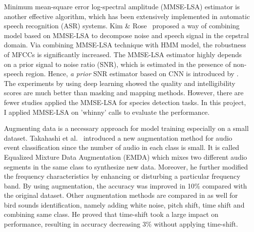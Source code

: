 Minimum mean-square error log-spectral amplitude (MMSE-LSA) estimator is another effective algorithm, which has been extensively implemented in automatic speech recognition (ASR) systems. Kim \& Rose~\cite{kim2002cepstrum} proposed a way of combining model based on MMSE-LSA to decompose noise and speech signal in the cepstral domain. Via combining MMSE-LSA technique with HMM model, the robustness of MFCCs is significantly increased. The MMSE-LSA estimator highly depends on a prior signal to noise ratio (SNR), which is estimated in the presence of non-speech region. Hence, \textit{a prior} SNR estimator based on CNN is introduced by \cite{nicolson2019deep}. The experiments by using deep learning showed the quality and intelligibility scores are much better than masking and mapping methods. However, there are fewer studies applied the MMSE-LSA for species detection tasks. In this project, I applied MMSE-LSA on 'whinny' calls to evaluate the performance.

Augmenting data is a necessary approach for model training especially on a small dataset. Takahashi et al.~\cite{takahashi2016deep} introduced a new augmentation method for audio event classification since the number of audio in each class is small. It is called Equalized Mixture Data Augmentation (EMDA) which mixes two different audio segments in the same class to synthesize new data. Moreover, he further modified the frequency characteristics by enhancing or disturbing a particular frequency band. By using augmentation, the accuracy was improved in 10\% compared with the original dataset. Other augmentation methods are compared in \cite{sprengel2016audio} as well for bird sounds identification, namely adding white noise, pitch shift, time shift and combining same class. He proved that time-shift took a large impact on performance, resulting in accuracy decreasing 3\% without applying time-shift. 


